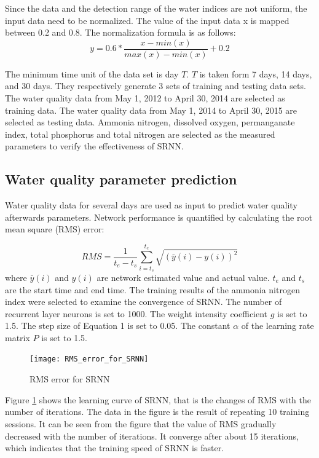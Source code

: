 \documentclass[runningheads]{llncs}
\begin{document}
Since the data and the detection range of the water indices are not 
uniform, the input data need to be normalized. The value of the 
input data x is mapped between 0.2 and 0.8. The normalization formula is as follows:
\begin{equation}
y=0.6*\frac{x-min(x)}{max(x)-min(x)}+0.2  
\end{equation}

The minimum time unit of the data set is day $T$. $T$ is taken form 7 days, 14 days, 
and 30 days. They respectively generate 3 sets of training and 
testing data sets. The water quality data from 
May 1, 2012 to April 30, 2014 are selected as training data. 
The water quality data  from May 1, 
2014 to April 30, 2015 are selected as testing data.
Ammonia nitrogen, dissolved oxygen, permanganate index, 
total phosphorus and total nitrogen are selected as the 
measured parameters to verify the effectiveness of SRNN.

\subsection{Water quality parameter prediction}
Water quality data for several days are used as input to 
predict water quality afterwards parameters. Network performance 
is quantified by calculating the root mean square (RMS) error:

\begin{equation}
RMS=  \frac{1}{t_e-t_s}\sum_{i=t_s}^{t_e}\sqrt{(\bar y(i)- y(i))^2}
\end{equation}
where $\bar y(i)$ and $y(i)$ are network estimated value and actual value. 
$t_e$ and $t_s$ are the start time and end time. The training results of the ammonia 
nitrogen index were selected to examine the convergence of SRNN. 
The number of recurrent layer neurons is set to 1000.
The weight intensity coefficient $g$ is set to 1.5. 
The step size of Equation 1 is set to 0.05. 
The constant $\alpha$ of the learning rate matrix $P$ is set to 1.5.
\begin{figure}[htbp]
\centering
\texttt{[image: RMS\_error\_for\_SRNN]}
\caption{RMS error for SRNN}
\label{RMS error for SRNN}
\end{figure}

Figure \ref{RMS error for SRNN} shows the learning curve of SRNN, that is the changes of 
RMS with the number of iterations. The data in the figure is the 
result of repeating 10 training sessions. 
It can be seen from the figure that the value of RMS 
gradually decreased with the number of iterations. 
It converge after about 15 iterations, which indicates that the training 
speed of SRNN is faster.
\end{document}
